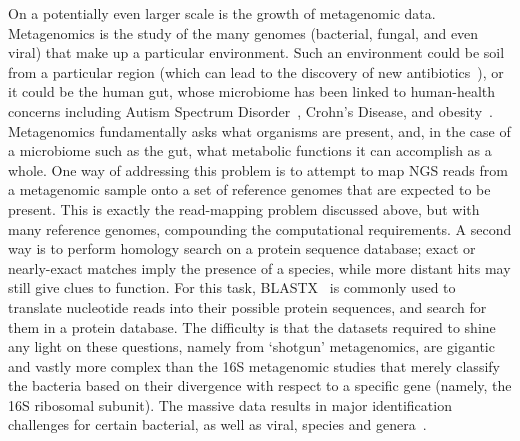 \documentclass{acm_proc_article-sp}
\begin{document}
On a potentially even larger scale is the growth of metagenomic data.
Metagenomics is the study of the many genomes (bacterial, fungal, and even 
viral) that make up a particular environment.
Such an environment could be soil from a particular region (which can lead to 
the discovery of new 
antibiotics~\cite{forsberg2012shared}), or it could be 
the human gut, whose microbiome has been linked to human-health concerns 
including Autism Spectrum Disorder~\cite{macfabe2012short}, 
Crohn's Disease, and 
obesity~\cite{kostic2014microbiome}.
Metagenomics fundamentally asks what organisms are present, and, in the case
of a microbiome such as the gut, what metabolic functions it can accomplish as
a whole.
One way of addressing this problem is to attempt to map NGS reads from a metagenomic sample
onto a set of reference genomes that are expected to be present.
This is exactly the read-mapping problem discussed above, but with many 
reference genomes, compounding the computational requirements.
A second way is to perform homology search on a protein sequence database;
exact or nearly-exact matches imply the presence of a species, while more 
distant hits may still give clues to function.
For this task, BLASTX~\cite{altschul1990basic} is commonly
used to translate nucleotide reads into their possible protein sequences, and
search for them in a protein database.
The difficulty is that the datasets required to shine any light on these 
questions, namely from `shotgun' metagenomics, are gigantic and vastly more 
complex than the 16S metagenomic studies that merely classify the bacteria 
based on 
their divergence with respect to a specific gene (namely, the 16S ribosomal 
subunit).
The massive data results in major identification 
challenges for certain bacterial, as well as viral, species and 
genera~\cite{janda200716s}. 
\end{document}
